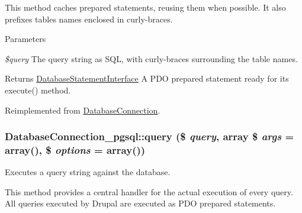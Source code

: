 This method caches prepared statements, reusing them when possible. It also prefixes tables names enclosed in curly-\/braces.


\begin{DoxyParams}{Parameters}
\item[{\em \$query}]The query string as SQL, with curly-\/braces surrounding the table names.\end{DoxyParams}
\begin{DoxyReturn}{Returns}
\hyperlink{interfaceDatabaseStatementInterface}{DatabaseStatementInterface} A PDO prepared statement ready for its execute() method. 
\end{DoxyReturn}


Reimplemented from \hyperlink{classDatabaseConnection_a3eb8c20adaffdd0f567bbe16d5226554}{DatabaseConnection}.\hypertarget{classDatabaseConnection__pgsql_aa03d55a2837d71b3e832102447bc815f}{
\subsubsection[{query}]{\setlength{\rightskip}{0pt plus 5cm}DatabaseConnection\_\-pgsql::query (\$ {\em query}, \/  array \$ {\em args} = {\ttfamily array()}, \/  \$ {\em options} = {\ttfamily array()})}}
\label{classDatabaseConnection__pgsql_aa03d55a2837d71b3e832102447bc815f}
Executes a query string against the database.

This method provides a central handler for the actual execution of every query. All queries executed by Drupal are executed as PDO prepared statements.


